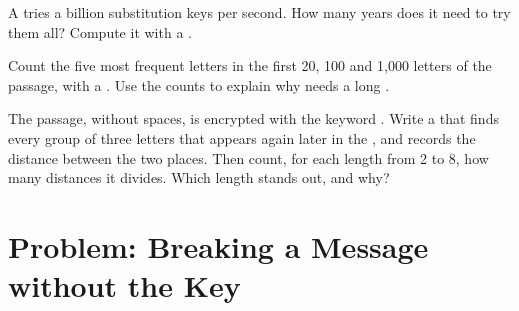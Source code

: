 \begin{exercise}[$\star\star\star$]\label{exo:g9:first-cryptography:10}
A  tries a billion substitution keys per second. How many years does it
need to try them all? Compute it with a .
\end{exercise}

\begin{exercise}[$\star\star\star$]\label{exo:g9:first-cryptography:11}
Count the five most frequent letters in the first 20, 100 and 1,000 letters of
the passage, with a . Use the counts to explain why 
needs a long .
\end{exercise}

\begin{exercise}[$\star\star\star$]\label{exo:g9:first-cryptography:12}
The passage, without spaces, is encrypted with the keyword . Write a
 that finds every group of three letters that appears again later in the
, and records the distance between the two places. Then count, for
each length from 2 to 8, how many distances it divides. Which length stands
out, and why?
\end{exercise}

\section{Problem: Breaking a Message without the Key}


